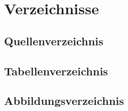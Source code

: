 \documentclass[oneside,11pt,parskip=half,ngerman]{scrreprt}
\begin{document}
\chapter{Verzeichnisse}\label{verzeichnisse}

\section{Quellenverzeichnis}\label{quellenverzeichnis}

\vspace*{-2.5cm}\renewcommand{\bibname}{}\begingroup \let\clearpage\relax
\printbibliography
\endgroup

\section{Tabellenverzeichnis}\label{tabellenverzeichnis}

\renewcommand{\listtablename}{} 

\begingroup \let\clearpage\relax
\listoftables
\endgroup

\section{Abbildungsverzeichnis}\label{abbildungsverzeichnis}

\renewcommand{\listfigurename}{} 

\begingroup\let\clearpage\relax
\listoffigures
\endgroup
\end{document}
